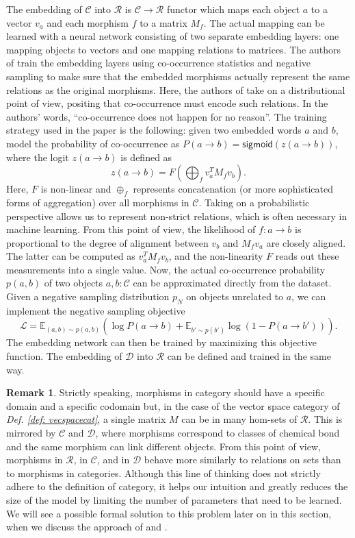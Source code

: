 \documentclass[11pt,a4paper,openright,twoside]{report}
\newcounter{mycounter}
\theoremstyle{plain}
\theoremstyle{definition}
\newtheorem{remark}[mycounter]{Remark}
\newcommand\dblquote[1]{\textquotedblleft #1\textquotedblright}
\begin{document}
The embedding of $\mathcal{C}$ into $\mathcal{R}$ is   $\mathcal{C} \to \mathcal{R}$ functor which maps each object $a$ to a vector $v_a$ and each morphism $f$ to a matrix $M_f$. The actual mapping can be learned with a neural network consisting of two separate embedding layers: one mapping objects to vectors and one mapping relations to matrices. The authors of \cite{sheshmani2021categorical} train the embedding layers using co-occurrence statistics and negative sampling to make sure that the embedded morphisms actually represent the same relations as the original morphisms. Here, the authors of \cite{sheshmani2021categorical} take on a distributional point of view, positing that co-occurrence must encode such relations. In the authors' words, \dblquote{co-occurrence does not happen for no reason}. The training strategy used in the paper is the following: given two embedded words $a$ and $b$, model the probability of co-occurrence as $P(a \to b) = \mathsf{sigmoid}(z(a \to b))$, where the logit $z(a \to b)$ is defined as
\[z(a \to b) = F\left(\bigoplus_f v_a^TM_fv_b \right).\]
Here, $F$ is non-linear and $\oplus_f$ represents concatenation (or more sophisticated forms of aggregation) over all morphisms in $\mathcal{C}$. Taking on a probabilistic perspective allows us to represent non-strict relations, which is often necessary in machine learning. From this point of view, the likelihood of $f: a \to b$ is proportional to the degree of alignment between $v_b$ and $M_fv_a$ are closely aligned. The latter can be computed as $v_a^TM_fv_b$, and the non-linearity $F$ reads out these measurements into a single value. Now, the actual co-occurrence probability $p(a,b)$ of two objects $a,b : \mathcal{C}$ can be approximated directly from the dataset. Given a negative sampling distribution $p_N$ on objects unrelated to $a$, we can implement the negative sampling objective
\[\mathcal{L} = \mathbb{E}_{(a,b) \sim p(a,b)}\left(\log P(a \to b) + \mathbb{E}_{b' \sim p(b')}\log (1-P(a \to b'))\right).\]
The embedding network can then be trained by maximizing this objective function. The embedding of $\mathcal{D}$ into $\mathcal{R}$ can be defined and trained in the same way.

\begin{remark}
  Strictly speaking, morphisms in category should have a specific domain and a specific codomain but, in the case of the vector space category of \textit{Def. \ref{def: vecspacecat}}, a single matrix $M$ can be in many hom-sets of $\mathcal{R}$. This is mirrored by $\mathcal{C}$ and $\mathcal{D}$, where morphisms correspond to classes of chemical bond and the same morphism can link different objects. From this point of view, morphisms in $\mathcal{R}$, in $\mathcal{C}$, and in $\mathcal{D}$ behave more similarly to relations on sets than to morphisms in categories.  Although this line of thinking does not strictly adhere to the definition of category, it helps our intuition and greatly reduces the size of the model by limiting the number of parameters that need to be learned. We will see a possible formal solution to this problem later on in this section, when we discuss the approach of \cite{coecke2010mathematical} and \cite{lewis2019compositionality}.
\end{remark}
\end{document}
